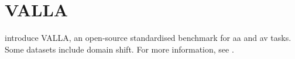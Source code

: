 \section{VALLA}
\label{sec:valla}

\citet{tyo_state_2022} introduce VALLA, an open-source standardised benchmark for \ac{aa} and \ac{av} tasks.
Some datasets include domain shift.
For more information, see \citep{tyo_state_2022}.